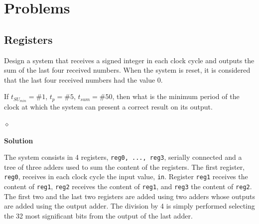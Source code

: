 \section{Problems}
\subsection{Registers}

\begin{problem}\label{mean}
Design a system that receives a signed integer in each clock cycle and outputs the sum of the last four received numbers. When the system is reset, it is considered that the last four received numbers had the value 0.

If $t_{SU_{min}} = \#1$, $t_p = \#5$, $t_{sum} = \#50$, then what is the minimum period of the clock at which the system can present a correct result on its output.

$\diamond$
\end{problem}

{\bf Solution}

The system consists in 4 registers, {\tt reg0, ..., reg3}, serially connected and a tree of three adders used to sum the content of the registers. The first register, {\tt reg0}, receives in each clock cycle the input value, {\tt in}. Register {\tt reg1} receives the content of {\tt reg1}, {\tt reg2} receives the content of {\tt reg1}, and {\tt reg3} the content of {\tt reg2}. The first two and the last two registers are added using two adders whose outputs are added using the output adder. The division by 4 is simply performed selecting the 32 most significant bits from the output of the last adder.






